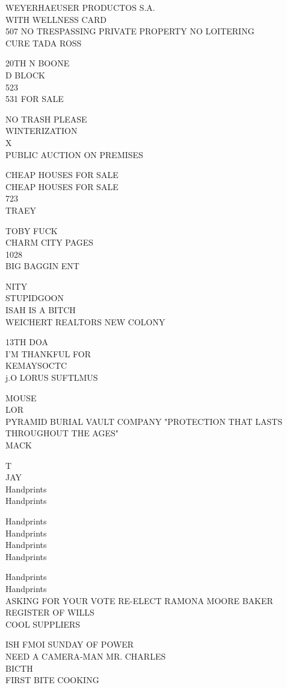 \documentclass[10pt,letterpaper]{article}
\begin{document}
WEYERHAEUSER PRODUCTOS S.A.\\
WITH WELLNESS CARD\\
507 NO TRESPASSING PRIVATE PROPERTY NO LOITERING\\
CURE TADA ROSS

20TH N BOONE\\
D BLOCK\\
523\\
531 FOR SALE

NO TRASH PLEASE\\
WINTERIZATION\\
X\\
PUBLIC AUCTION ON PREMISES

CHEAP HOUSES FOR SALE\\
CHEAP HOUSES FOR SALE\\
723\\
TRAEY

TOBY FUCK\\
CHARM CITY PAGES\\
1028\\
BIG BAGGIN ENT

NITY\\
STUPIDGOON\\
ISAH IS A BITCH\\
WEICHERT REALTORS NEW COLONY

13TH DOA\\
I'M THANKFUL FOR\\
KEMAYSOCTC\\
j.O LORUS SUFTLMUS

MOUSE\\
LOR\\
PYRAMID BURIAL VAULT COMPANY "PROTECTION THAT LASTS THROUGHOUT THE AGES"\\
MACK

T\\
JAY\\
Handprints\\
Handprints

Handprints\\
Handprints\\
Handprints\\
Handprints

Handprints\\
Handprints\\
ASKING FOR YOUR VOTE RE{-}ELECT RAMONA MOORE BAKER REGISTER OF WILLS\\
COOL SUPPLIERS

ISH FMOI SUNDAY OF POWER\\
NEED A CAMERA{-}MAN MR. CHARLES\\
BICTH\\
FIRST BITE COOKING
\end{document}
